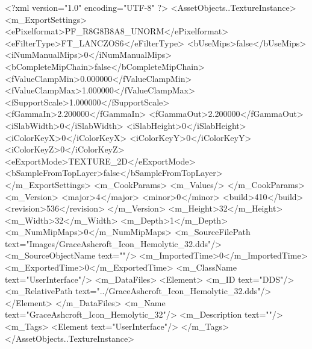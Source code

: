 <?xml version="1.0" encoding="UTF-8" ?>
<AssetObjects..TextureInstance>
	<m_ExportSettings>
		<ePixelformat>PF_R8G8B8A8_UNORM</ePixelformat>
		<eFilterType>FT_LANCZOS6</eFilterType>
		<bUseMips>false</bUseMips>
		<iNumManualMips>0</iNumManualMips>
		<bCompleteMipChain>false</bCompleteMipChain>
		<fValueClampMin>0.000000</fValueClampMin>
		<fValueClampMax>1.000000</fValueClampMax>
		<fSupportScale>1.000000</fSupportScale>
		<fGammaIn>2.200000</fGammaIn>
		<fGammaOut>2.200000</fGammaOut>
		<iSlabWidth>0</iSlabWidth>
		<iSlabHeight>0</iSlabHeight>
		<iColorKeyX>0</iColorKeyX>
		<iColorKeyY>0</iColorKeyY>
		<iColorKeyZ>0</iColorKeyZ>
		<eExportMode>TEXTURE_2D</eExportMode>
		<bSampleFromTopLayer>false</bSampleFromTopLayer>
	</m_ExportSettings>
	<m_CookParams>
		<m_Values/>
	</m_CookParams>
	<m_Version>
		<major>4</major>
		<minor>0</minor>
		<build>410</build>
		<revision>536</revision>
	</m_Version>
	<m_Height>32</m_Height>
	<m_Width>32</m_Width>
	<m_Depth>1</m_Depth>
	<m_NumMipMaps>0</m_NumMipMaps>
	<m_SourceFilePath text="Images/GraceAshcroft_Icon_Hemolytic_32.dds"/>
	<m_SourceObjectName text=""/>
	<m_ImportedTime>0</m_ImportedTime>
	<m_ExportedTime>0</m_ExportedTime>
	<m_ClassName text="UserInterface"/>
	<m_DataFiles>
		<Element>
			<m_ID text="DDS"/>
			<m_RelativePath text="../GraceAshcroft_Icon_Hemolytic_32.dds"/>
		</Element>
	</m_DataFiles>
	<m_Name text="GraceAshcroft_Icon_Hemolytic_32"/>
	<m_Description text=""/>
	<m_Tags>
		<Element text="UserInterface"/>
	</m_Tags>
</AssetObjects..TextureInstance>
